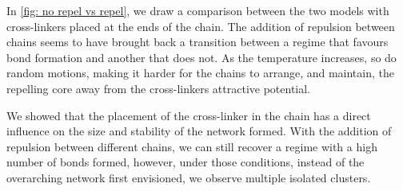 \documentclass[../../main.tex]{subfiles}
\begin{document}
    In \cref{fig: no repel vs repel}, we draw a comparison between the two models with cross-linkers placed at the ends of the chain. The addition of repulsion between chains seems to have brought back a transition between a regime that favours bond formation and another that does not. As the temperature increases, so do random motions, making it harder for the chains to arrange, and maintain, the repelling core away from the cross-linkers attractive potential.
    
    We showed that the placement of the cross-linker in the chain has a direct influence on the size and stability of the network formed. With the addition of repulsion between different chains, we can still recover a regime with a high number of bonds formed, however, under those conditions, instead of the overarching network first envisioned, we observe multiple isolated clusters.

  
%
\end{document}
